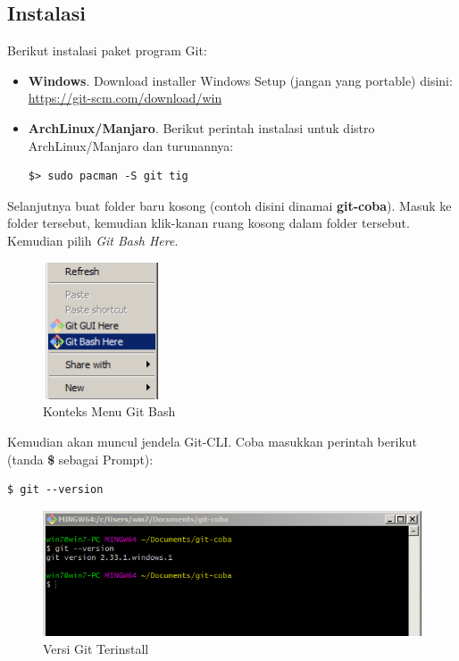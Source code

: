 \documentclass[12pt]{book}
\begin{document}
	\subsection{Instalasi}
	
	Berikut instalasi paket program Git:
	\begin{itemize}
		\item \textbf{Windows}. Download installer Windows Setup (jangan yang portable) disini:\\
		\url{https://git-scm.com/download/win}
		
		\item \textbf{ArchLinux/Manjaro}. Berikut perintah instalasi untuk distro ArchLinux/Manjaro dan turunannya:
		\begin{verbatim}
$> sudo pacman -S git tig
		\end{verbatim}
	\end{itemize}

	Selanjutnya buat folder baru kosong (contoh disini dinamai \textbf{git-coba}).
	Masuk ke folder tersebut, kemudian klik-kanan ruang kosong dalam folder tersebut.
	Kemudian pilih \textit{Git Bash Here}.
	
	\begin{figure}[!ht]
		\centering
		\includegraphics[width=100pt]{images/githere0}
		\caption{Konteks Menu Git Bash}
	\end{figure}
	
	\newpage
	Kemudian akan muncul jendela Git-CLI.
	Coba masukkan perintah berikut (tanda \textbf{\$} sebagai Prompt):
	\begin{verbatim}
$ git --version
	\end{verbatim}
	
	\begin{figure}[!ht]
		\centering
		\includegraphics[width=400pt]{images/git0}
		\caption{Versi Git Terinstall}
	\end{figure}
	 
\end{document}
